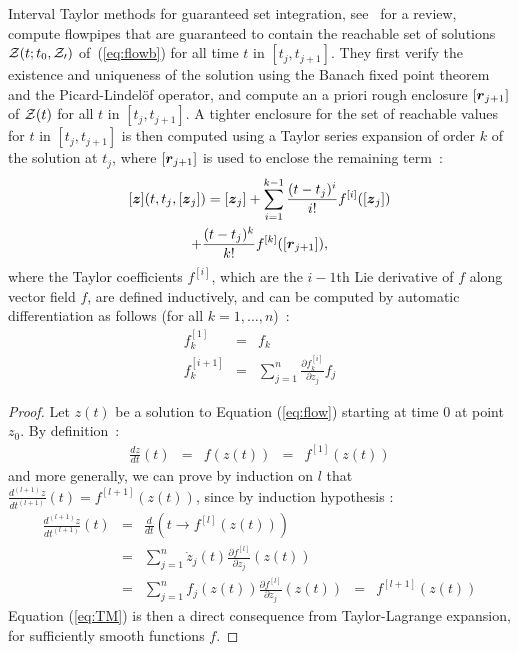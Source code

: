 \documentclass{sig-alternate-05-2015} %
\begin{document}
Interval Taylor methods for guaranteed set integration, see~\cite{Nedialkov99} for a review, compute flowpipes that are guaranteed
 to contain the reachable set of solutions 
${\cal Z}(t;t_0, {\cal Z_0})$ of~(\ref{eq:flowb}) for all time $t$ in $[t_j,t_{j+1}]$. They first verify the existence and uniqueness of 
the solution using the Banach fixed point theorem and the Picard-Lindel\"of operator, and compute an a priori rough enclosure $[{\r}_{j+1}]$ of 
   ${\cal Z}(t)$ for all $t$ in $[t_j,t_{j+1}]$. A tighter enclosure for the set of reachable values for $t$ in $[t_j,t_{j+1}]$ is then computed 
using a Taylor series expansion of order $k$ of the solution at $t_j$, where $[{\r}_{j+1}]$ is used to enclose the remaining term~: 
\begin{multline} 
[\z](t,t_j,[{\z}_j]) =  [{\z}_j] + \sum\limits_{i=1}^{k-1} \frac{(t-t_j)^i}{i !} f^{[i]}([{\z}_j])\\
 + \frac{(t-t_j)^k}{k !} f^{[k]}([{\r}_{j+1}]),
\label{eq:TM}
\end{multline}
where the Taylor coefficients $f^{[i]}$, which are the $i-1$th Lie derivative of $f$ along
vector field $f$, are defined inductively, and 
can be computed by automatic differentiation as follows (for all $k=1,\ldots,n$)~: 
\begin{eqnarray}
f^{[1]}_k & = & f_k \\
f^{[i+1]}_k & = & \sum\limits_{j=1}^n \frac{\partial{f^{[i]}_k}}{\partial z_j} f_j
\label{Lie1}
\end{eqnarray}

\begin{proof}
Let $z(t)$ be a solution to Equation (\ref{eq:flow}) starting at
time 0 at point $z_0$. By definition~: 
$$
\begin{array}{rclcl}
\frac{d z}{d t}(t) & = & f(z(t)) & = & f^{[1]}(z(t))
\end{array}$$
\noindent and more generally, we can prove by induction on $l$ that 
$\frac{d^{(l+1)} z}{dt^{(l+1)}}(t) = f^{[l+1]}(z(t))$, 
since by induction hypothesis :
$$\begin{array}{rclcl}
\frac{d^{(l+1)} z}{dt^{(l+1)}}(t) & = & \frac{d}{dt}\left(t \rightarrow
f^{[l]}(z(t))\right) \\
& = & \sum\limits_{j=1}^n \dot{z}_j(t) \frac{\partial f^{[l]}}{\partial z_j}(z(t)) \\
& = & \sum\limits_{j=1}^n f_j(z(t)) \frac{\partial f^{[l]}}{\partial z_j}(z(t)) 
& = & f^{[l+1]}(z(t))
\end{array}$$
Equation (\ref{eq:TM}) is then a direct consequence from Taylor-La\-grange expansion, for sufficiently smooth functions $f$. 
\end{proof}
\end{document}
